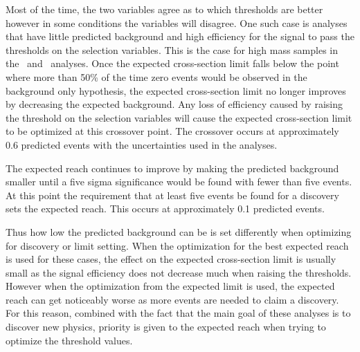 Most of the time, the two variables agree as to which thresholds are better however in some
conditions the variables will disagree. One such case is analyses that have little predicted background and high efficiency for the signal to pass the thresholds on the
selection variables. This is the case for high mass samples in the \tktof\  and \tkonly\ analyses.
Once the expected cross-section limit falls below the point where more than 50\% of the time zero events would be observed in the background only hypothesis,
the expected cross-section limit no longer improves
by decreasing the expected background. Any loss of efficiency caused by raising the threshold on the selection variables will cause the expected cross-section limit to be optimized
at this crossover point. The crossover occurs at approximately 0.6 predicted events with the uncertainties used in the analyses. 

The expected reach continues to improve by making the predicted background smaller until a five sigma significance would be found with fewer than five events. At this
point the requirement that at least five events be found for a discovery sets the expected reach.
This occurs at approximately 0.1 predicted events. 

Thus how low the predicted background can be is set differently when optimizing for discovery or limit setting.
When the optimization for the best expected reach is used for these cases, the
effect on the expected cross-section limit is usually small as the signal efficiency does not decrease much when raising the thresholds. However
when the optimization from the expected limit is used, the expected reach can get noticeably worse as more events are needed to claim a discovery.
For this reason, combined with the fact that the main goal of these analyses is to discover new physics, priority
is given to the expected reach when trying to optimize the threshold values.



